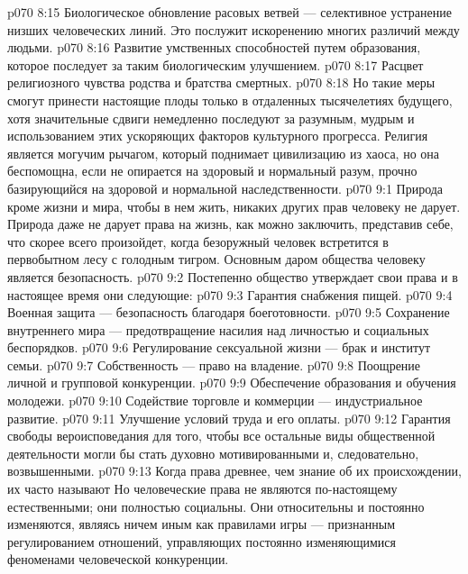 \vs p070 8:15 \bibnobreakspace Биологическое обновление расовых ветвей --- селективное устранение низших человеческих линий. Это послужит искоренению многих различий между людьми.
\vs p070 8:16 \bibnobreakspace Развитие умственных способностей путем образования, которое последует за таким биологическим улучшением.
\vs p070 8:17 \bibnobreakspace Расцвет религиозного чувства родства и братства смертных.
\vs p070 8:18 \pc Но такие меры смогут принести настоящие плоды только в отдаленных тысячелетиях будущего, хотя значительные сдвиги немедленно последуют за разумным, мудрым и  использованием этих ускоряющих факторов культурного прогресса. Религия является могучим рычагом, который поднимает цивилизацию из хаоса, но она беспомощна, если не опирается на здоровый и нормальный разум, прочно базирующийся на здоровой и нормальной наследственности.
\vs p070 9:1 Природа кроме жизни и мира, чтобы в нем жить, никаких других прав человеку не дарует. Природа даже не дарует права на жизнь, как можно заключить, представив себе, что скорее всего произойдет, когда безоружный человек встретится в первобытном лесу с голодным тигром. Основным даром общества человеку является безопасность.
\vs p070 9:2 \pc Постепенно общество утверждает свои права и в настоящее время они следующие:
\vs p070 9:3 \bibnobreakspace Гарантия снабжения пищей.
\vs p070 9:4 \bibnobreakspace Военная защита --- безопасность благодаря боеготовности.
\vs p070 9:5 \bibnobreakspace Сохранение внутреннего мира --- предотвращение насилия над личностью и социальных беспорядков.
\vs p070 9:6 \bibnobreakspace Регулирование сексуальной жизни --- брак и институт семьи.
\vs p070 9:7 \bibnobreakspace Собственность --- право на владение.
\vs p070 9:8 \bibnobreakspace Поощрение личной и групповой конкуренции.
\vs p070 9:9 \bibnobreakspace Обеспечение образования и обучения молодежи.
\vs p070 9:10 \bibnobreakspace Содействие торговле и коммерции --- индустриальное развитие.
\vs p070 9:11 \bibnobreakspace Улучшение условий труда и его оплаты.
\vs p070 9:12 \bibnobreakspace Гарантия свободы вероисповедания для того, чтобы все остальные виды общественной деятельности могли бы стать духовно мотивированными и, следовательно, возвышенными.
\vs p070 9:13 \pc Когда права древнее, чем знание об их происхождении, их часто называют  Но человеческие права не являются по\hyp{}настоящему естественными; они полностью социальны. Они относительны и постоянно изменяются, являясь ничем иным как правилами игры --- признанным регулированием отношений, управляющих постоянно изменяющимися феноменами человеческой конкуренции.

